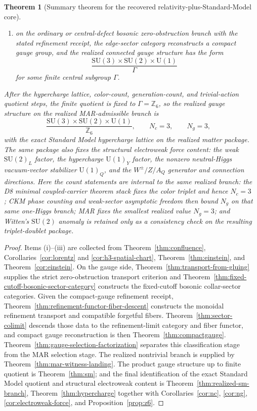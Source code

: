 \documentclass[11pt]{article}
\newtheorem{theorem}{Theorem}[section]
\newcommand{\SU}{\mathrm{SU}}
\newcommand{\U}{\mathrm{U}}
\begin{document}
\begin{theorem}[Summary theorem for the recovered relativity-plus-Standard-Model core]
\begin{enumerate}[label=(\roman*),leftmargin=2em]
\[\]
\item on the ordinary or central-defect bosonic zero-obstruction branch with the stated refinement receipt, the edge-sector category reconstructs a compact gauge group, and the realized connected gauge structure has the form
\[
\frac{\SU(3)\times\SU(2)\times\U(1)}{\Gamma}
\]
for some finite central subgroup \(\Gamma\).
\end{enumerate}
After the hypercharge lattice, color-count, generation-count, and trivial-action quotient steps, the finite quotient is fixed to \(\Gamma=\mathbb Z_6\), so the realized gauge structure on the realized MAR-admissible branch is
\[
\frac{\SU(3)\times\SU(2)\times\U(1)}{\mathbb Z_6},
\qquad
N_c=3,
\qquad
N_g=3,
\]
with the exact Standard Model hypercharge lattice on the realized matter package. The same package also fixes the structural electroweak force content: the weak \(\SU(2)_L\) factor, the hypercharge \(\U(1)_Y\) factor, the nonzero neutral-Higgs vacuum-vector stabilizer \(\U(1)_Q\), and the \(W^\pm/Z/A_Q\) generator and connection directions. Here the count statements are internal to the same realized branch: the D8 minimal coupled-carrier theorem stack fixes the color triplet and hence \(N_c=3\); CKM phase counting and weak-sector asymptotic freedom then bound \(N_g\) on that same one-Higgs branch; MAR fixes the smallest realized value \(N_g=3\); and Witten's \(\SU(2)\) anomaly is retained only as a consistency check on the resulting triplet-doublet package.
\end{theorem}

\begin{proof}
Items (i)--(iii) are collected from Theorem~\ref{thm:confluence}, Corollaries~\ref{cor:lorentz} and \ref{cor:h3-spatial-chart}, Theorem~\ref{thm:einstein}, and Theorem~\ref{cor:einstein}. On the gauge side, Theorem~\ref{thm:transport-from-gluing} supplies the strict zero-obstruction transport criterion and Theorem~\ref{thm:fixed-cutoff-bosonic-sector-category} constructs the fixed-cutoff bosonic collar-sector categories. Given the compact-gauge refinement receipt, Theorem~\ref{thm:refinement-functor-fiber-descent} constructs the monoidal refinement transport and compatible forgetful fibers. Theorem~\ref{thm:sector-colimit} descends those data to the refinement-limit category and fiber functor, and compact gauge reconstruction is then Theorem~\ref{thm:compactgauge}. Theorem~\ref{thm:gauge-selection-factorization} separates this classification stage from the MAR selection stage. The realized nontrivial branch is supplied by Theorem~\ref{thm:mar-witness-landing}. The product gauge structure up to finite quotient is Theorem~\ref{thm:sm}; and the final identification of the exact Standard Model quotient and structural electroweak content is Theorem~\ref{thm:realized-sm-branch}, Theorem~\ref{thm:hypercharge} together with Corollaries~\ref{cor:nc}, \ref{cor:ng}, \ref{cor:electroweak-force}, and Proposition~\ref{prop:z6}.
\end{proof}
\end{document}
